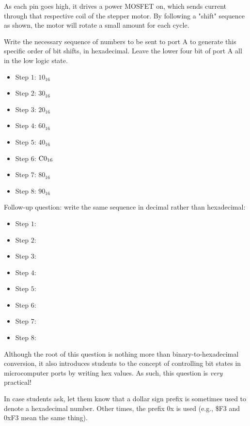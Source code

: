 As each pin goes high, it drives a power MOSFET on, which sends current through that respective coil of the stepper motor.  By following a "shift" sequence as shown, the motor will rotate a small amount for each cycle. 

Write the necessary sequence of numbers to be sent to port A to generate this specific order of bit shifts, in hexadecimal.  Leave the lower four bit of port A all in the low logic state.







\begin{itemize}
\goodbreak
\item{Step $1$:} $10_{16}$
\item{Step $2$:} $30_{16}$
\item{Step $3$:} $20_{16}$
\item{Step $4$:} $60_{16}$
\item{Step $5$:} $40_{16}$
\item{Step $6$:} $\hbox{C}0_{16}$
\item{Step $7$:} $80_{16}$
\item{Step $8$:} $90_{16}$
\end{itemize}

\vskip 10pt

Follow-up question: write the same sequence in decimal rather than hexadecimal:

\begin{itemize}
\goodbreak
\item{Step $1$:}
\item{Step $2$:}
\item{Step $3$:}
\item{Step $4$:}
\item{Step $5$:}
\item{Step $6$:}
\item{Step $7$:}
\item{Step $8$:}
\end{itemize}







Although the root of this question is nothing more than binary-to-hexadecimal conversion, it also introduces students to the concept of controlling bit states in microcomputer ports by writing hex values.  As such, this question is {\it very} practical!

In case students ask, let them know that a dollar sign prefix is sometimes used to denote a hexadecimal number.  Other times, the prefix 0x is used (e.g., \$F3 and 0xF3 mean the same thing).




